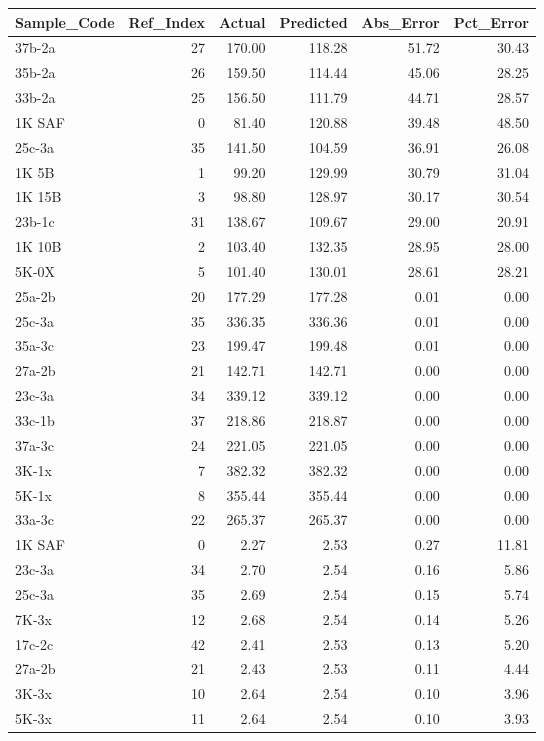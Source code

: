 \begin{tabular}{lrrrrr}
\toprule
Sample_Code & Ref_Index & Actual & Predicted & Abs_Error & Pct_Error \\
\midrule
37b-2a & 27 & 170.00 & 118.28 & 51.72 & 30.43 \\
35b-2a & 26 & 159.50 & 114.44 & 45.06 & 28.25 \\
33b-2a & 25 & 156.50 & 111.79 & 44.71 & 28.57 \\
1K SAF & 0 & 81.40 & 120.88 & 39.48 & 48.50 \\
25c-3a & 35 & 141.50 & 104.59 & 36.91 & 26.08 \\
1K 5B & 1 & 99.20 & 129.99 & 30.79 & 31.04 \\
1K 15B & 3 & 98.80 & 128.97 & 30.17 & 30.54 \\
23b-1c & 31 & 138.67 & 109.67 & 29.00 & 20.91 \\
1K 10B & 2 & 103.40 & 132.35 & 28.95 & 28.00 \\
5K-0X & 5 & 101.40 & 130.01 & 28.61 & 28.21 \\
25a-2b & 20 & 177.29 & 177.28 & 0.01 & 0.00 \\
25c-3a & 35 & 336.35 & 336.36 & 0.01 & 0.00 \\
35a-3c & 23 & 199.47 & 199.48 & 0.01 & 0.00 \\
27a-2b & 21 & 142.71 & 142.71 & 0.00 & 0.00 \\
23c-3a & 34 & 339.12 & 339.12 & 0.00 & 0.00 \\
33c-1b & 37 & 218.86 & 218.87 & 0.00 & 0.00 \\
37a-3c & 24 & 221.05 & 221.05 & 0.00 & 0.00 \\
3K-1x & 7 & 382.32 & 382.32 & 0.00 & 0.00 \\
5K-1x & 8 & 355.44 & 355.44 & 0.00 & 0.00 \\
33a-3c & 22 & 265.37 & 265.37 & 0.00 & 0.00 \\
1K SAF & 0 & 2.27 & 2.53 & 0.27 & 11.81 \\
23c-3a & 34 & 2.70 & 2.54 & 0.16 & 5.86 \\
25c-3a & 35 & 2.69 & 2.54 & 0.15 & 5.74 \\
7K-3x & 12 & 2.68 & 2.54 & 0.14 & 5.26 \\
17c-2c & 42 & 2.41 & 2.53 & 0.13 & 5.20 \\
27a-2b & 21 & 2.43 & 2.53 & 0.11 & 4.44 \\
3K-3x & 10 & 2.64 & 2.54 & 0.10 & 3.96 \\
5K-3x & 11 & 2.64 & 2.54 & 0.10 & 3.93 \\

\end{tabular}
